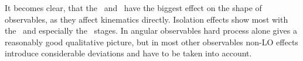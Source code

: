 It becomes clear, that the \sttwo\ and \stthree\ have the biggest
effect on the shape of observables, as they affect kinematics
directly. Isolation effects show most with the \stfour\ and especially
the \stfive\ stages. In angular observables hard process alone gives a
reasonably good qualitative picture, but in most other observables
non-LO effects introduce considerable deviations and have to be taken
into account.


